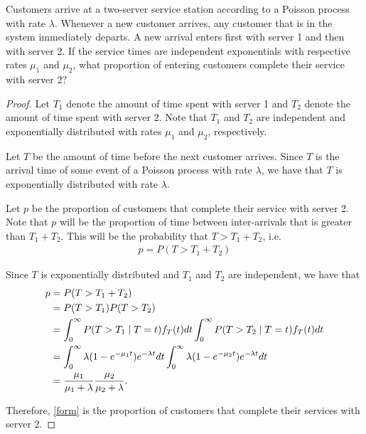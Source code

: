 \begin{problem}{5.43}
  Customers arrive at a two-server service station according to a Poisson process
  with rate $\lambda$. Whenever a new customer arrives, any customer that is in
  the system immediately departs. A new arrival enters first with server 1
  and then with server 2. If the service times are independent exponentials
  with respective rates $\mu_1$ and $\mu_2$, what proportion of entering
  customers complete their service with server 2?
\end{problem}

\begin{proof}
  Let $T_1$ denote the amount of time spent with server 1 and $T_2$ denote
  the amount of time spent with server 2. Note that $T_1$ and $T_2$ are
  independent and exponentially distributed with rates $\mu_1$ and $\mu_2$, respectively.

  Let $T$ be the amount of time before the next customer arrives. Since $T$ is
  the arrival time of some event of a Poisson process with rate $\lambda$,
  we have that $T$ is exponentially distributed with rate $\lambda$.

  Let $p$ be the proportion of customers that complete their service with server 2.
  Note that $p$ will be the proportion of time between inter-arrivals that is greater than $T_1 + T_2$.
  This will be the probability that $T > T_1 + T_2$, i.e.\
  \begin{align*}
    p = P(T > T_1 + T_2)
  \end{align*}

  Since $T$ is exponentially distributed and $T_1$ and $T_2$ are independent, we have that
  \begin{align}\label{form}
    p &= P(T > T_1 + T_2) \notag \\
    &= P(T > T_1)P(T > T_2) \notag \\
    &= \int_0^\infty P(T > T_1 \mid T = t) f_{T}(t) dt \int_0^\infty P(T > T_2 \mid T = t) f_{T}(t) dt \notag \\
    &= \int_0^\infty \lambda(1-e^{-\mu_1 t})e^{-\lambda t} dt \int_0^\infty \lambda(1-e^{-\mu_2 t})e^{-\lambda t} dt \notag \\
    &= \frac{\mu_1}{\mu_1 + \lambda} \frac{\mu_2}{\mu_2 + \lambda}.
  \end{align}

  Therefore, \eqref{form} is the proportion of customers that complete their services with server 2.
\end{proof}
\newpage
